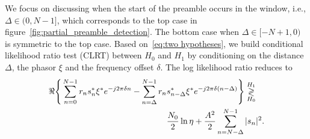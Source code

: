 
We focus on discussing when the start of the preamble 
occurs in the window, i.e., $\Delta\in(0,N{-}1]$, which corresponds to
the top case in figure~\ref{fig:partial_preamble_detection}.
The bottom case when 
$\Delta\in[-N{+}1,0)$ 
is symmetric to the top case.
Based on~\eqref{eq:two hypotheses}, we build conditional likelihood ratio test (CLRT)
between $H_0$ and $H_1$ by conditioning on the distance $\Delta$, 
the phasor $\xi$ and the frequency offset $\delta$. The log likelihood ratio reduces to
\begin{equation}
    \label{eq:log likelihood}
    \begin{aligned}
    \Re\Bigg\{\sum_{n=0}^{N-1}r_ns_n^*\xi^*e^{-j2\pi\delta n}-\sum_{n=\Delta}^{N-1}r_n&s_{n-\Delta}^*\xi^*e^{-j2\pi\delta(n-\Delta)}\Bigg\} \mathrel{\mathop\gtrless\limits^{H_1}_{H_0}} \\
    &\frac{N_0}{2}\ln\eta+\frac{A^2}{2}\sum_{n=N-\Delta}^{N-1}|s_n|^2.
    \end{aligned}
\end{equation}

